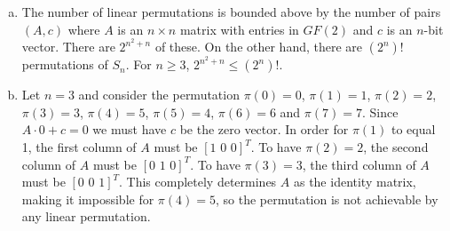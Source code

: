 \documentclass{article}
\begin{document}
\begin{enumerate}[a.]
\item The number of linear permutations is bounded above by the number of pairs $(A,c)$ where $A$ is an $n \times n$ matrix with entries in $GF(2)$ and $c$ is an $n$-bit vector.  There are $2^{n^2+n}$ of these.  On the other hand, there are $(2^n)!$ permutations of $S_n$.  For $n \geq 3$, $2^{n^2+n} \leq (2^n)!$.  

\item Let $n=3$ and consider the permutation $\pi(0) = 0$, $\pi(1)=1$, $\pi(2)=2$, $\pi(3)=3$, $\pi(4) = 5$, $\pi(5)=4$, $\pi(6)=6$ and $\pi(7) = 7$.  Since $A\cdot0 + c=0$ we must have $c$ be the zero vector.  In order for $\pi(1)$ to equal 1, the first column of $A$ must be $[1\,\, 0\,\,0]^T$.  To have $\pi(2)=2$, the second column of $A$ must be $[0 \,\, 1\,\,0]^T$.  To have $\pi(3)=3$, the third column of $A$ must be $[0\,\, 0\,\, 1]^T$.  This completely determines $A$ as the identity matrix, making it impossible for $\pi(4)=5$, so the permutation is not achievable by any linear permutation. 

\end{enumerate}
\end{document}
